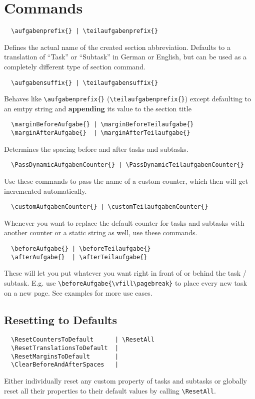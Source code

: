 \documentclass{ctext}
\begin{document}
\section{Commands}
\begin{verbatim}
  \aufgabenprefix{} | \teilaufgabenprefix{}
\end{verbatim}
Defines the actual name of the created section abbreviation.
Defaults to a translation of "`Task"' or "`Subtask"' in German or English, but can be used as a completely different type of section command.

\begin{verbatim}
  \aufgabensuffix{} | \teilaufgabensuffix{}
\end{verbatim}
Behaves like \verb|\aufgabenprefix{}| (\verb|\teilaufgabenprefix{}|) except defaulting to an emtpy string and \textbf{appending} its value to the section title

\begin{verbatim}
  \marginBeforeAufgabe{} | \marginBeforeTeilaufgabe{}
  \marginAfterAufgabe{}  | \marginAfterTeilaufgabe{}
\end{verbatim}
Determines the spacing before and after tasks and subtasks.

\begin{verbatim}
  \PassDynamicAufgabenCounter{} | \PassDynamicTeilaufgabenCounter{}
\end{verbatim}
Use these commands to pass the name of a custom counter, which then will get incremented automatically.

\begin{verbatim}
  \customAufgabenCounter{} | \customTeilaufgabenCounter{}
\end{verbatim}
Whenever you want to replace the default counter for tasks and subtasks with another counter or a static string as well, use these commands.

\begin{verbatim}
  \beforeAufgabe{} | \beforeTeilaufgabe{}
  \afterAufgabe{}  | \afterTeilaufgabe{}
\end{verbatim}
These will let you put whatever you want right in front of or behind the task / subtask. E.g. use \verb|\beforeAufgabe{\vfill\pagebreak}| to place every new task on a new page. See examples for more use cases.
\subsection{Resetting to Defaults}
\begin{verbatim}
  \ResetCountersToDefault      | \ResetAll
  \ResetTranslationsToDefault  |
  \ResetMarginsToDefault       |
  \ClearBeforeAndAfterSpaces   |
\end{verbatim}
Either individually reset any custom property of tasks and subtasks or globally reset all their properties to their default values by calling \verb|\ResetAll|.
\end{document}

